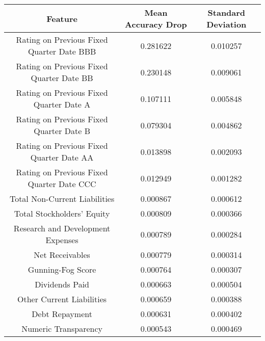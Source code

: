 \tiny
\begin{tabular}{ccc}
\toprule
Feature & Mean Accuracy Drop & Standard Deviation \\
\midrule
Rating on Previous Fixed Quarter Date BBB & 0.281622 & 0.010257 \\
Rating on Previous Fixed Quarter Date BB & 0.230148 & 0.009061 \\
Rating on Previous Fixed Quarter Date A & 0.107111 & 0.005848 \\
Rating on Previous Fixed Quarter Date B & 0.079304 & 0.004862 \\
Rating on Previous Fixed Quarter Date AA & 0.013898 & 0.002093 \\
Rating on Previous Fixed Quarter Date CCC & 0.012949 & 0.001282 \\
Total Non-Current Liabilities & 0.000867 & 0.000612 \\
Total Stockholders' Equity & 0.000809 & 0.000366 \\
Research and Development Expenses & 0.000789 & 0.000284 \\
Net Receivables & 0.000779 & 0.000314 \\
Gunning-Fog Score & 0.000764 & 0.000307 \\
Dividends Paid & 0.000663 & 0.000504 \\
Other Current Liabilities & 0.000659 & 0.000388 \\
Debt Repayment & 0.000631 & 0.000402 \\
Numeric Transparency & 0.000543 & 0.000469 \\
\bottomrule
\end{tabular}

\normalsize